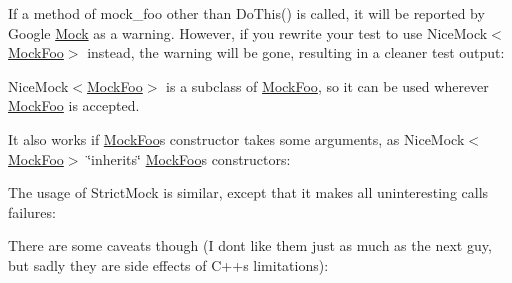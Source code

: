 If a method of {\ttfamily mock\+\_\+foo} other than {\ttfamily Do\+This()} is called, it will be reported by Google \mbox{\hyperlink{class_mock}{Mock}} as a warning. However, if you rewrite your test to use {\ttfamily Nice\+Mock$<$\mbox{\hyperlink{class_mock_foo}{Mock\+Foo}}$>$} instead, the warning will be gone, resulting in a cleaner test output\+:


\begin{DoxyCode}{0}
\DoxyCodeLine{}
\DoxyCodeLine{\}}
\end{DoxyCode}


{\ttfamily Nice\+Mock$<$\mbox{\hyperlink{class_mock_foo}{Mock\+Foo}}$>$} is a subclass of {\ttfamily \mbox{\hyperlink{class_mock_foo}{Mock\+Foo}}}, so it can be used wherever {\ttfamily \mbox{\hyperlink{class_mock_foo}{Mock\+Foo}}} is accepted.

It also works if {\ttfamily \mbox{\hyperlink{class_mock_foo}{Mock\+Foo}}}\textquotesingle{}s constructor takes some arguments, as {\ttfamily Nice\+Mock$<$\mbox{\hyperlink{class_mock_foo}{Mock\+Foo}}$>$} \char`\"{}inherits\char`\"{} {\ttfamily \mbox{\hyperlink{class_mock_foo}{Mock\+Foo}}}\textquotesingle{}s constructors\+:


\begin{DoxyCode}{0}
\DoxyCodeLine{}
\DoxyCodeLine{\}}
\end{DoxyCode}


The usage of {\ttfamily Strict\+Mock} is similar, except that it makes all uninteresting calls failures\+:


\begin{DoxyCode}{0}
\DoxyCodeLine{}
\DoxyCodeLine{}
\DoxyCodeLine{\}}
\end{DoxyCode}


There are some caveats though (I don\textquotesingle{}t like them just as much as the next guy, but sadly they are side effects of C++\textquotesingle{}s limitations)\+:


